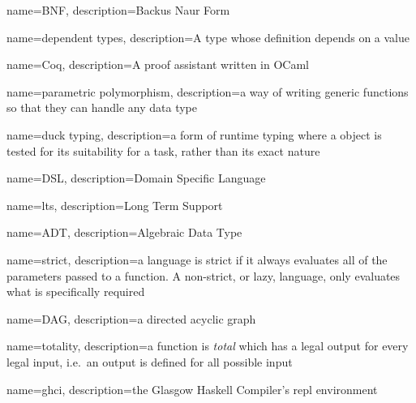 {%
    name=BNF,
    description={Backus Naur Form}
}

{%
    name={dependent types},
    description={A type whose definition depends on a value}
}

{%
    name=Coq,
    description={A proof assistant written in OCaml}
}

{%
    name={parametric polymorphism},
    description={a way of writing generic functions so that they can handle any data type}
}

{%
    name={duck typing},
    description={a form of runtime typing where a object is tested for its suitability for a task,
    rather than its exact nature}
}

{%
    name={DSL},
    description={Domain Specific Language}
}

{%
    name={lts},
    description={Long Term Support}
}

{%
    name={ADT},
    description={Algebraic Data Type}
}

{%
    name={strict},
    description={a language is strict if it always evaluates all of the parameters passed to a
    function. A non-strict, or lazy, language, only evaluates what is specifically required}
}

{%
    name={DAG},
    description={a directed acyclic graph}
}

{%
    name={totality},
    description={a function is \textit{total} which has a legal output for every legal input, i.e.\ an output is
    defined for all possible input}
}

{%
    name={ghci},
    description={the Glasgow Haskell Compiler's repl environment}
}

